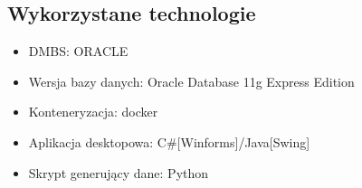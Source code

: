 \documentclass{article}
\begin{document}
\subsection{Wykorzystane technologie}
\begin{itemize}
    \item DMBS: ORACLE
    \item Wersja bazy danych: Oracle Database 11g Express Edition
    \item Konteneryzacja: docker
    \item Aplikacja desktopowa: C\#[Winforms]/Java[Swing]
    \item Skrypt generujący dane: Python
\end{itemize}
\end{document}
